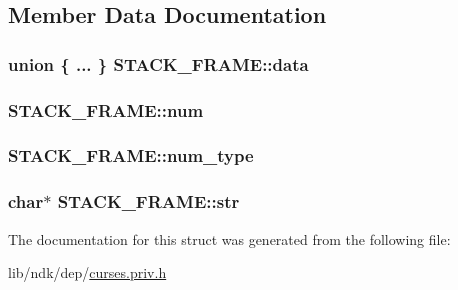 \subsection{Member Data Documentation}
\hypertarget{struct_s_t_a_c_k___f_r_a_m_e_a7ccc1e7a7e91be58bc243ea95c497778}{
\subsubsection[{data}]{\setlength{\rightskip}{0pt plus 5cm}union \{ ... \}   S\-T\-A\-C\-K\-\_\-\-F\-R\-A\-M\-E\-::data}}\label{struct_s_t_a_c_k___f_r_a_m_e_a7ccc1e7a7e91be58bc243ea95c497778}
\hypertarget{struct_s_t_a_c_k___f_r_a_m_e_a79dca7c915bee598ae3477e50360f0d9}{
\subsubsection[{num}]{ S\-T\-A\-C\-K\-\_\-\-F\-R\-A\-M\-E\-::num}}\label{struct_s_t_a_c_k___f_r_a_m_e_a79dca7c915bee598ae3477e50360f0d9}
\hypertarget{struct_s_t_a_c_k___f_r_a_m_e_a0e1fa442ad580bbf485cfe9570ca5653}{
\subsubsection[{num\-\_\-type}]{ S\-T\-A\-C\-K\-\_\-\-F\-R\-A\-M\-E\-::num\-\_\-type}}\label{struct_s_t_a_c_k___f_r_a_m_e_a0e1fa442ad580bbf485cfe9570ca5653}
\hypertarget{struct_s_t_a_c_k___f_r_a_m_e_a45720698c7e0a2653ec1c5a5cdabbb38}{
\subsubsection[{str}]{\setlength{\rightskip}{0pt plus 5cm}char$\ast$ S\-T\-A\-C\-K\-\_\-\-F\-R\-A\-M\-E\-::str}}\label{struct_s_t_a_c_k___f_r_a_m_e_a45720698c7e0a2653ec1c5a5cdabbb38}


The documentation for this struct was generated from the following file\-:\begin{DoxyCompactItemize}
\item 
lib/ndk/dep/\hyperlink{curses_8priv_8h}{curses.\-priv.\-h}\end{DoxyCompactItemize}
